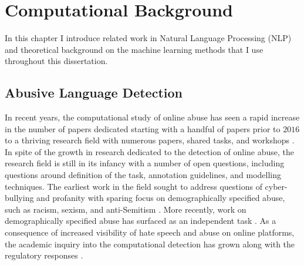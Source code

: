 \chapter{Computational Background}\label{chap:nlp}

\ifpdf
    \graphicspath{{Chapter3/Figs/Raster/}{Chapter3/Figs/PDF/}{Chapter3/Figs/}}
\else
    \graphicspath{{Chapter3/Figs/Vector/}{Chapter3/Figs/}}
\fi

In this chapter I introduce related work in Natural Language Processing (NLP) and theoretical background on the machine learning methods that I use throughout this dissertation.


\section{Abusive Language Detection}

In recent years, the computational study of online abuse has seen a rapid increase in the number of papers dedicated starting with a handful of papers prior to $2016$ to a thriving research field with numerous papers, shared tasks, and workshops \citep{Vidgen:2020}. In spite of the growth in research dedicated to the detection of online abuse, the research field is still in its infancy with a number of open questions, including questions around definition of the task, annotation guidelines, and modelling techniques.
The earliest work in the field sought to address questions of cyber-bullying \citep{Chen:2012,Cho:2013,Reynolds:2011} and profanity \citep{Sood:profanity:2012,Sood:2013} with sparing focus on demographically specified abuse, such as racism, sexism, and anti-Semitism \citep{Warner:2012}. More recently, work on demographically specified abuse has surfaced as an independent task \citep{Tulkens:2015,Waseem:2016,Waseem-Hovy:2016,Park:2017,Samghabadi:2017,Karan:2018,Gorrell:2018,Stoop:2019,Meyer:2019,Palmer:2020,Vidgen:2020}. As a consequence of increased visibility of hate speech and abuse on online platforms, the academic inquiry into the computational detection has grown along with the regulatory responses \citep{Regulatory stuff: NetzDG, EUcommision on hate speech}.

